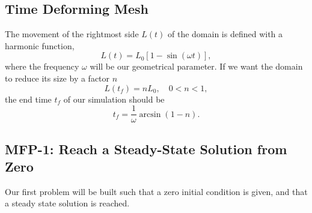 \documentclass[../main.tex]{subfiles}
\begin{document}
\subsection{Time Deforming Mesh}
The movement of the rightmost side $L(t)$ of the domain is defined with a harmonic function, 
\begin{equation}
    L(t) = L_0 \left[1 - \sin\left(\omega t\right)\right],
\end{equation}
where the frequency $\omega$ will be our geometrical parameter.
If we want the domain to reduce its size by a factor $n$
\begin{equation}
    L(t_f) = n L_0, \quad 0 < n < 1,
\end{equation}
the end time $t_f$ of our simulation should be
\begin{equation}
    t_f = \frac{1}{\omega} \arcsin\left(1 - n\right).
\end{equation}



\subsection{MFP-1: Reach a Steady-State Solution from Zero}
Our first problem will be built such that a zero initial condition is given, and that a steady state solution is reached. 
\end{document}

